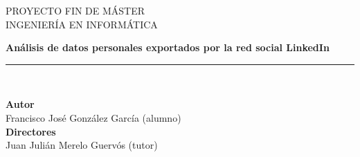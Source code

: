 \begin{titlepage}
 
 
\setlength{\centeroffset}{-0.5\oddsidemargin}
\addtolength{\centeroffset}{0.5\evensidemargin}
\thispagestyle{empty}

\noindent\hspace*{\centeroffset}\begin{minipage}{\textwidth}

\centering

\textsc{ \Large PROYECTO FIN DE MÁSTER\\[0.2cm]}
\textsc{ INGENIERÍA EN INFORMÁTICA}\\[1cm]
% 

\vspace{3.3cm}

\vspace{0.5cm}


{\Huge\bfseries Análisis de datos personales exportados por la red social LinkedIn\\
}
\noindent\rule[-1ex]{\textwidth}{3pt}\\[3.5ex]
\end{minipage}

\vspace{2.5cm}
\noindent\hspace*{\centeroffset}\begin{minipage}{\textwidth}
\centering

\textbf{Autor}\\ {Francisco José González García (alumno)}\\[2.5ex]
\textbf{Directores}\\
{Juan Julián Merelo Guervós (tutor)}\\[2cm]
\end{minipage}


\end{titlepage}


